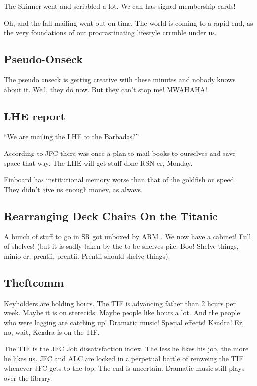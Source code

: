 \documentclass[10pt]{article}
\begin{document}
The Skinner went and scribbled a lot. We can has signed membership cards!

Oh, and the fall mailing went out on time. The world is coming to a rapid end, as the very foundations of our procrastinating lifestyle crumble under us. 

\subsection*{Pseudo-Onseck}

The pseudo onseck is getting creative with these minutes and nobody knows about it. Well, they do now. But they can't stop me! MWAHAHA!

\subsection*{LHE report}

``We are mailing the LHE to the Barbados?''

According to JFC there was once a plan to mail books to ourselves and save space that way. The LHE will get stuff done RSN-er, Monday.

Finboard has institutional memory worse than that of the goldfish on speed. They didn't give us enough money, as always.

\subsection*{Rearranging Deck Chairs On the Titanic}

A bunch of stuff to go in SR got unboxed by ARM . We now have a cabinet! Full of shelves! (but it is sadly taken by the to be shelves pile. Boo! Shelve things, minio-er, prentii, prentii. Prentii should shelve things).

\subsection*{Theftcomm}

Keyholders are holding hours. The TIF is advancing father than 2 hours per week. Maybe it is on stereoids. Maybe people like hours a lot. And the people who were lagging are catching up! Dramatic music! Special effects! Kendra! Er, no, wait, Kendra is on the TIF.

The TIF is the JFC Job dissatisfaction index. The less he likes his job, the more he likes us. JFC and ALC are locked in a perpetual battle of renweing the TIF whenever JFC gets to the top. The end is uncertain. Dramatic music still plays over the library.
\end{document}
